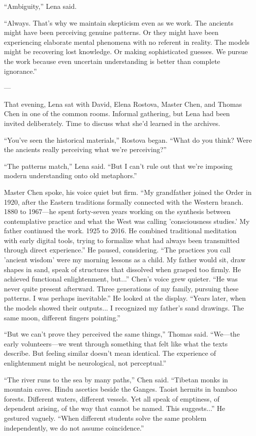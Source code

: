 ``Ambiguity,'' Lena said.

``Always. That's why we maintain skepticism even as we work. The ancients might have been perceiving genuine patterns. Or they might have been experiencing elaborate mental phenomena with no referent in reality. The models might be recovering lost knowledge. Or making sophisticated guesses. We pursue the work because even uncertain understanding is better than complete ignorance.''

---

That evening, Lena sat with David, Elena Rostova, Master Chen, and Thomas Chen in one of the common rooms. Informal gathering, but Lena had been invited deliberately. Time to discuss what she'd learned in the archives.

``You've seen the historical materials,'' Rostova began. ``What do you think? Were the ancients really perceiving what we're perceiving?''

``The patterns match,'' Lena said. ``But I can't rule out that we're imposing modern understanding onto old metaphors.''

Master Chen spoke, his voice quiet but firm. ``My grandfather joined the Order in 1920, after the Eastern traditions formally connected with the Western branch. 1880 to 1967—he spent forty-seven years working on the synthesis between contemplative practice and what the West was calling 'consciousness studies.' My father continued the work. 1925 to 2016. He combined traditional meditation with early digital tools, trying to formalize what had always been transmitted through direct experience.'' He paused, considering. ``The practices you call 'ancient wisdom' were my morning lessons as a child. My father would sit, draw shapes in sand, speak of structures that dissolved when grasped too firmly. He achieved functional enlightenment, but...'' Chen's voice grew quieter. ``He was never quite present afterward. Three generations of my family, pursuing these patterns. I was perhaps inevitable.'' He looked at the display. ``Years later, when the models showed their outputs... I recognized my father's sand drawings. The same moon, different fingers pointing.''

``But we can't prove they perceived the same things,'' Thomas said. ``We—the early volunteers—we went through something that felt like what the texts describe. But feeling similar doesn't mean identical. The experience of enlightenment might be neurological, not perceptual.''

``The river runs to the sea by many paths,'' Chen said. ``Tibetan monks in mountain caves. Hindu ascetics beside the Ganges. Taoist hermits in bamboo forests. Different waters, different vessels. Yet all speak of emptiness, of dependent arising, of the way that cannot be named. This suggests...'' He gestured vaguely. ``When different students solve the same problem independently, we do not assume coincidence.''


